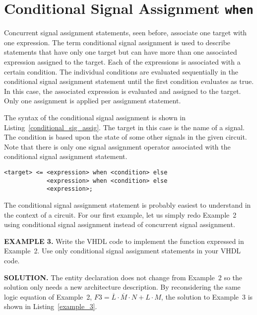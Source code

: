 \section{Conditional Signal Assignment \texttt{when}}
Concurrent signal assignment statements, seen before, associate one target with one expression. The term conditional signal assignment is used to describe statements that have only one target but can have more than one associated expression assigned to the target. Each of the expressions is associated with a certain condition. The individual conditions are evaluated sequentially in the conditional signal assignment statement until the first condition evaluates as true. In this case, the associated expression is evaluated and assigned to the target. Only one assignment is applied per assignment statement.

The syntax of the conditional signal assignment is shown in Listing~\ref{conditional_sig_assig}. The target in this case is the name of a signal. The condition is based upon the state of some other signals in the given circuit. Note that there is only one signal assignment operator associated with the conditional signal assignment statement.

\noindent
\begin{minipage}{0.99\linewidth}
\begin{lstlisting}[label=conditional_sig_assig, caption=The syntax for the conditional signal assignment statement.]
<target> <=	<expression> when <condition> else
			<expression> when <condition> else
			<expression>;
\end{lstlisting}
\end{minipage}

The conditional signal assignment statement is probably easiest to understand in the context of a circuit. For our first example, let us simply redo Example~2 using conditional signal assignment instead of concurrent signal assignment.

\begin{leftbar}
\noindent
\textbf{EXAMPLE 3.}
Write the VHDL code to implement the function expressed in Example~2. Use only conditional signal assignment statements in your VHDL code.
\end{leftbar}
\noindent
\textbf{SOLUTION.} The entity declaration does not change from Example~2 so the solution only needs a new architecture description. By reconsidering the same logic equation of Example~2, $F3=\overline{L} \cdot \overline{M} \cdot N+L \cdot M$, the solution to Example~3 is shown in Listing~\ref{example_3}.

